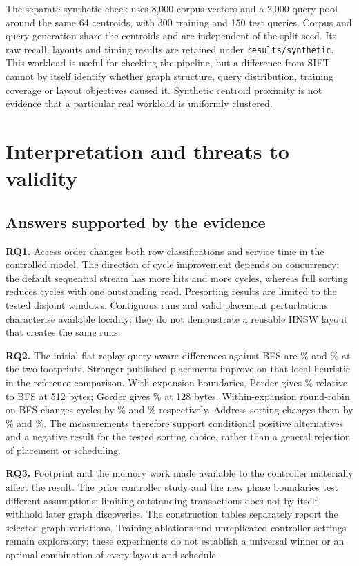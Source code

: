 \documentclass[11pt,a4paper]{report}
\begin{document}
The separate synthetic check uses 8,000 corpus vectors and a 2,000-query pool around the same 64 centroids, with 300 training and 150 test queries. Corpus and query generation share the centroids and are independent of the split seed. Its raw recall, layouts and timing results are retained under \texttt{results/synthetic}. This workload is useful for checking the pipeline, but a difference from SIFT cannot by itself identify whether graph structure, query distribution, training coverage or layout objectives caused it. Synthetic centroid proximity is not evidence that a particular real workload is uniformly clustered.

\chapter{Interpretation and threats to validity}
\section{Answers supported by the evidence}
\textbf{RQ1.} Access order changes both row classifications and service time in the controlled model. The direction of cycle improvement depends on concurrency: the default sequential stream has more hits and more cycles, whereas full sorting reduces cycles with one outstanding read. Presorting results are limited to the tested disjoint windows. Contiguous runs and valid placement perturbations characterise available locality; they do not demonstrate a reusable HNSW layout that creates the same runs.

\textbf{RQ2.} The initial flat-replay query-aware differences against BFS are \QADeltaFloat\% and \QADeltaCompact\% at the two footprints. Stronger published placements improve on that local heuristic in the reference comparison. With expansion boundaries, Porder gives \PorderBoundedFloat\% relative to BFS at 512 bytes; Gorder gives \GorderBoundedCompact\% at 128 bytes. Within-expansion round-robin on BFS changes cycles by \RoundRobinBFSMeanFloat\% and \RoundRobinBFSMeanCompact\% respectively. Address sorting changes them by \SortedBFSMeanFloat\% and \SortedBFSMeanCompact\%. The measurements therefore support conditional positive alternatives and a negative result for the tested sorting choice, rather than a general rejection of placement or scheduling.

\textbf{RQ3.} Footprint and the memory work made available to the controller materially affect the result. The prior controller study and the new phase boundaries test different assumptions: limiting outstanding transactions does not by itself withhold later graph discoveries. The construction tables separately report the selected graph variations. Training ablations and unreplicated controller settings remain exploratory; these experiments do not establish a universal winner or an optimal combination of every layout and schedule.
\end{document}
